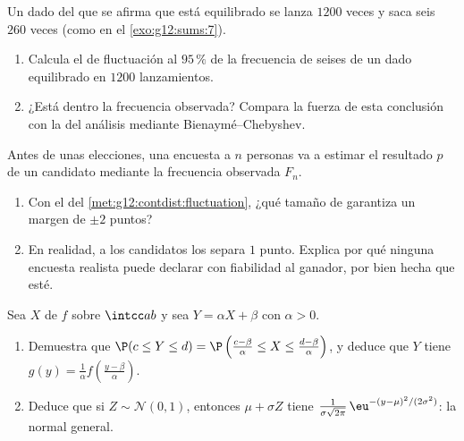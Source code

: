 \begin{exercise}[$\star\star$]\label{exo:g12:contdist:7}
Un dado del que se afirma que está equilibrado se lanza $1200$ veces y saca
seis $260$ veces (como en el \cref{exo:g12:sums:7}).
\begin{enumerate}
  \item Calcula el  de fluctuación al $95\,\%$ de la frecuencia de
        seises de un dado equilibrado en $1200$ lanzamientos.
  \item ¿Está dentro la frecuencia observada? Compara la fuerza de esta
        conclusión con la del análisis mediante Bienaymé--Chebyshev.
\end{enumerate}
\end{exercise}

\begin{exercise}[$\star\star\star$]\label{exo:g12:contdist:8}
Antes de unas elecciones, una encuesta a $n$ personas va a estimar el
resultado $p$ de un candidato mediante la frecuencia observada $F_n$.
\begin{enumerate}
  \item Con el  del
        \cref{met:g12:contdist:fluctuation}, ¿qué tamaño de 
        garantiza un margen de $\pm 2$ puntos?
  \item En realidad, a los candidatos los separa $1$ punto. Explica por qué
        ninguna encuesta realista puede declarar con fiabilidad al ganador,
        por bien hecha que esté.
\end{enumerate}
\end{exercise}

\begin{exercise}[$\star\star\star$]\label{exo:g12:contdist:9}
Sea $X$ de  $f$ sobre $\intcc ab$ y sea $Y = \alpha X + \beta$ con
$\alpha > 0$.
\begin{enumerate}
  \item Demuestra que $\P(c \leq Y \leq d)
        = \P\left(\frac{c - \beta}{\alpha} \leq X \leq
        \frac{d-\beta}{\alpha}\right)$, y deduce que $Y$ tiene 
        $g(y) = \frac{1}{\alpha} f\left(\frac{y - \beta}{\alpha}\right)$.
  \item Deduce que si $Z \sim \mathcal N(0,1)$, entonces
        $\mu + \sigma Z$ tiene 
        $\frac{1}{\sigma\sqrt{2\pi}}\,
        \eu^{-(y - \mu)^2/(2\sigma^2)}$: la  normal general.
\end{enumerate}
\end{exercise}

